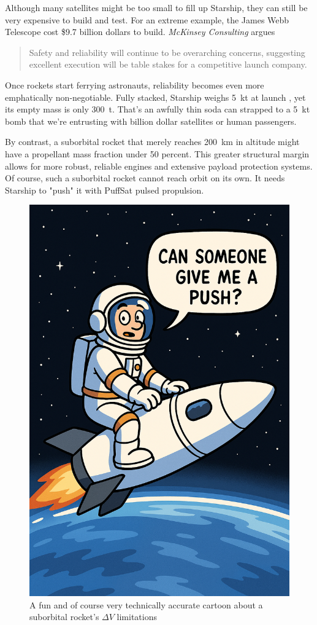 \documentclass{article}
\begin{document}
{Although many satellites might be too small to fill up Starship, they can still be very expensive to build and test. For an extreme example, the James Webb Telescope \cite{james_webb_space_telescope} cost \$9.7 billion dollars \cite{jwst_cost} to build. \textit{McKinsey Consulting} argues 

\begin{quote}
Safety and reliability will continue to be overarching concerns, suggesting excellent execution will be table stakes for a competitive launch company. \cite{mckinsey_reliability}
\end{quote}

Once rockets start ferrying astronauts, reliability becomes even more emphatically non-negotiable. Fully stacked, Starship weighs \SI{5}{\kilo\tonne} at launch \cite{starship}, yet its empty mass is only \SI{300}{\tonne}. That’s an awfully thin soda can strapped to a \SI{5}{\kilo\tonne} bomb that we're entrusting with billion dollar satellites or human passengers.

By contrast, a suborbital rocket that merely reaches \SI{200}{\kilo\meter} in altitude might have a propellant mass fraction under 50 percent. This greater structural margin allows for more robust, reliable engines and extensive payload protection systems. Of course, such a suborbital rocket cannot reach orbit on its own.  It needs Starship to "push" it with PuffSat pulsed propulsion.

\begin{figure}[htpb]
    \centering
    \includegraphics[width=0.5\linewidth]{images/new_push_picture.png}
    \caption{A fun and of course very technically accurate cartoon about a suborbital rocket's $\Delta V$ limitations}
    \label{fig:suborbital-cartoon}
\end{figure}

}
\end{document}
